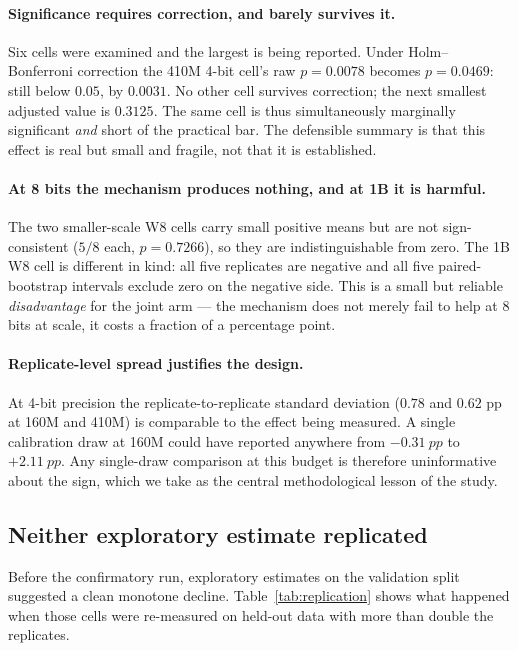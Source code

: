 \paragraph{Significance requires correction, and barely survives it.} Six cells were
examined and the largest is being reported. Under Holm--Bonferroni correction the 410M
4-bit cell's raw $p = 0.0078$ becomes $p = 0.0469$: still below $0.05$, by $0.0031$. No other
cell survives correction; the next smallest adjusted value is $0.3125$. The same cell is thus
simultaneously marginally significant \emph{and} short of the practical bar. The defensible
summary is that this effect is real but small and fragile, not that it is established.

\paragraph{At 8 bits the mechanism produces nothing, and at 1B it is harmful.} The two
smaller-scale W8 cells carry small positive means but are not sign-consistent ($5/8$ each,
$p = 0.7266$), so they are indistinguishable from zero. The 1B W8 cell is different in kind:
all five replicates are negative and all five paired-bootstrap intervals exclude zero on the
negative side. This is a small but reliable \emph{disadvantage} for the joint arm --- the
mechanism does not merely fail to help at 8 bits at scale, it costs a fraction of a
percentage point.

\paragraph{Replicate-level spread justifies the design.} At 4-bit precision the
replicate-to-replicate standard deviation ($0.78$ and $0.62$ pp at 160M and 410M) is
comparable to the effect being measured. A single calibration draw at 160M could have
reported anywhere from $-\SI{0.31}{pp}$ to $+\SI{2.11}{pp}$. Any single-draw comparison at
this budget is therefore uninformative about the sign, which we take as the central
methodological lesson of the study.

\subsection{Neither exploratory estimate replicated}
\label{subsec:replication}

Before the confirmatory run, exploratory estimates on the validation split suggested a clean
monotone decline. Table~\ref{tab:replication} shows what happened when those cells were
re-measured on held-out data with more than double the replicates.

